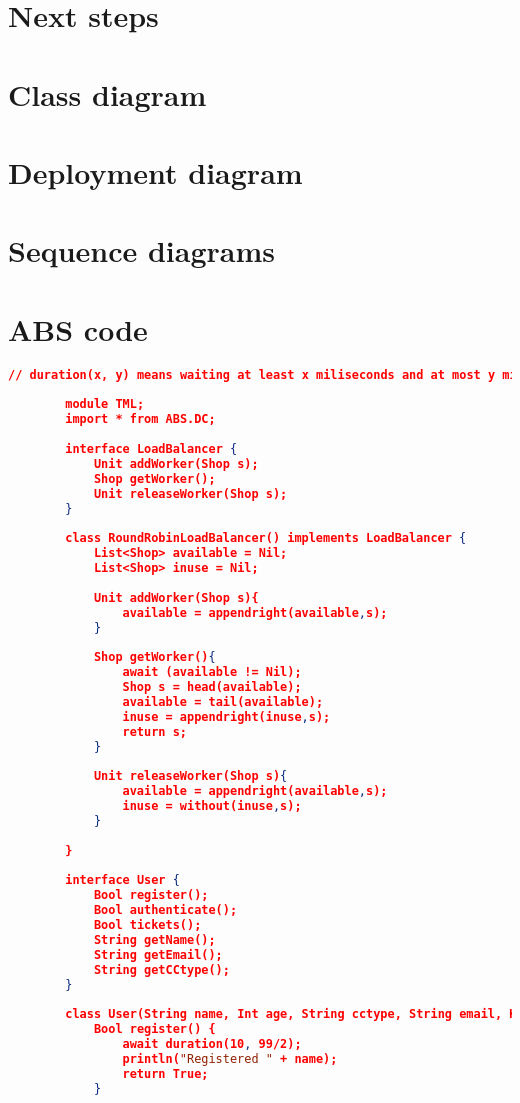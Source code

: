 \documentclass[10pt,a4paper,twocolumn]{article}
\begin{document}
\section{Next steps}

\newpage
\newpage
\begin{appendices}
	\section{Class diagram}
	
	\section{Deployment diagram}
	
	\section{Sequence diagrams}
	
	\section{ABS code}
	\label{appendix:abscode}
	\begin{lstlisting}[language=json]
		// duration(x, y) means waiting at least x miliseconds and at most y miliseconds
		
		module TML;
		import * from ABS.DC;
		
		interface LoadBalancer {
			Unit addWorker(Shop s);
			Shop getWorker();
			Unit releaseWorker(Shop s);
		}
		
		class RoundRobinLoadBalancer() implements LoadBalancer {
			List<Shop> available = Nil; 
			List<Shop> inuse = Nil;
			
			Unit addWorker(Shop s){
				available = appendright(available,s);
			}
			
			Shop getWorker(){
				await (available != Nil);
				Shop s = head(available); 
				available = tail(available); 
				inuse = appendright(inuse,s);
				return s;
			}
		
			Unit releaseWorker(Shop s){
				available = appendright(available,s); 
				inuse = without(inuse,s);
			}
		
		}
		
		interface User {
			Bool register();
			Bool authenticate();
			Bool tickets();
			String getName();
			String getEmail();
			String getCCtype();
		}
		
		class User(String name, Int age, String cctype, String email, Keyvault k) implements User {
			Bool register() {
				await duration(10, 99/2);
				println("Registered " + name);
				return True;
			}
			

\end{lstlisting}
\end{appendices}
\end{document}
